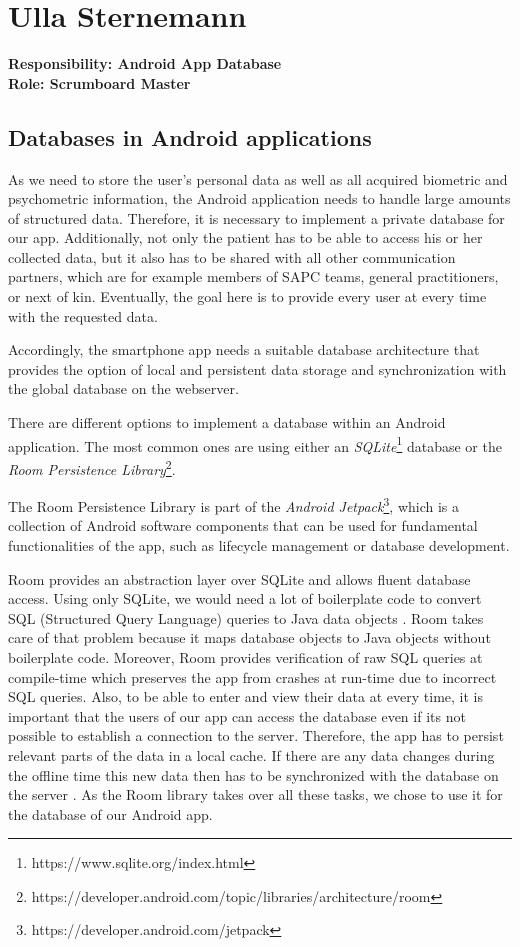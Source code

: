 \section{Ulla Sternemann}
\textbf{Responsibility: Android App Database}\\
\textbf{Role: Scrumboard Master}\\

\subsection{Databases in Android applications}

As we need to store the user's personal data as well as all acquired biometric and psychometric information, the Android application needs to handle large amounts of structured data. Therefore, it is necessary to implement a private database for our app. 
Additionally, not only the patient has to be able to access his or her collected data, but it also has to be shared with all other communication partners, which are for example members of SAPC teams, general practitioners, or next of kin. Eventually, the goal here is to provide every user at every time with the requested data. 

Accordingly, the smartphone app needs a suitable database architecture that provides the option of local and persistent data storage and synchronization with the global database on the webserver. 

There are different options to implement a database within an Android application. The most common ones are using either an \textit{SQLite}\footnote{https://www.sqlite.org/index.html} database or the \textit{Room Persistence Library}\footnote{https://developer.android.com/topic/libraries/architecture/room}. 

The Room Persistence Library is part of the \textit{Android Jetpack}\footnote{https://developer.android.com/jetpack}, which is a collection of Android software components that can be used for fundamental functionalities of the app, such as lifecycle management or database development. 

Room provides an abstraction layer over SQLite and allows fluent database access. Using only SQLite, we would need a lot of boilerplate code to convert SQL (Structured Query Language) queries to Java data objects \cite{wei2012android}. Room takes care of that problem because it maps database objects to Java objects without boilerplate code. Moreover, Room provides verification of raw SQL queries at compile-time which preserves the app from crashes at run-time due to incorrect SQL queries. Also, to be able to enter and view their data at every time, it is important that the users of our app can access the database even if its not possible to establish a connection to the server. Therefore, the app has to persist relevant parts of the data in a local cache. If there are any data changes during the offline time this new data then has to be synchronized with the database on the server \cite{room1}. As the Room library takes over all these tasks, we chose to use it for the database of our Android app. 


